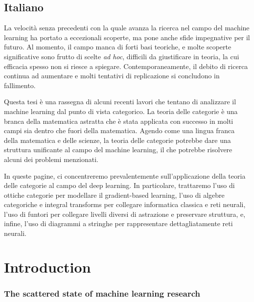 \documentclass[11pt,a4paper,openright,twoside]{report}
\theoremstyle{plain}
\theoremstyle{definition}
\begin{document}
\section*{Italiano}

La velocità senza precedenti con la quale avanza la ricerca nel campo del machine learning ha portato a eccezionali scoperte, ma pone anche sfide impegnative per il futuro.
Al momento, il campo manca di forti basi teoriche, e molte scoperte significative sono frutto di scelte \textit{ad hoc}, difficili da giustificare in teoria, la cui efficacia spesso non si riesce a spiegare. Contemporaneamente, il debito di ricerca continua ad aumentare e molti tentativi di replicazione si concludono in fallimento. 

Questa tesi è una rassegna di alcuni recenti lavori che tentano di analizzare il machine learning dal punto di vista categorico. La teoria delle categorie è una branca della matematica astratta che è stata applicata con successo in molti campi sia dentro che fuori della matematica. Agendo come una lingua franca della matematica e delle scienze, la teoria delle categorie potrebbe dare una struttura unificante al campo del machine learning, il che potrebbe risolvere alcuni dei problemi menzionati.

In queste pagine, ci concentreremo prevalentemente sull'applicazione della teoria delle categorie al campo del deep learning. In particolare, trattaremo l'uso di ottiche categorie per modellare il gradient-based learning, l'uso di algebre categoriche e integral transforms per collegare informatica classica e reti neurali, l'uso di funtori per collegare livelli diversi di astrazione e preservare struttura, e, infine, l'uso di diagrammi a stringhe per rappresentare dettagliatamente reti neurali.

\clearpage{\pagestyle{empty}\cleardoublepage}



\chapter*{Introduction}   

\subsection*{The scattered state of machine learning research}
\end{document}
